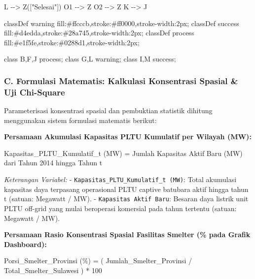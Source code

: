 \documentclass[
]{article}
\newenvironment{Shaded}{}{}
\newcommand{\NormalTok}[1]{#1}
\begin{document}
\begin{Shaded}
\begin{Highlighting}[]
\NormalTok{    L {-}{-}\textgreater{} Z(["Selesai"])}
\NormalTok{    O1 {-}{-}\textgreater{} Z}
\NormalTok{    O2 {-}{-}\textgreater{} Z}
\NormalTok{    K {-}{-}\textgreater{} J}
    
\NormalTok{    classDef warning fill:\#ffcccb,stroke:\#ff0000,stroke{-}width:2px;}
\NormalTok{    classDef success fill:\#d4edda,stroke:\#28a745,stroke{-}width:2px;}
\NormalTok{    classDef process fill:\#e1f5fe,stroke:\#0288d1,stroke{-}width:2px;}
    
\NormalTok{    class B,F,J process;}
\NormalTok{    class G,L warning;}
\NormalTok{    class I,M success;}
\end{Highlighting}
\end{Shaded}

\subsubsection{C. Formulasi Matematis: Kalkulasi Konsentrasi Spasial \&
Uji
Chi-Square}\label{c.-formulasi-matematis-kalkulasi-konsentrasi-spasial-uji-chi-square}

Parameterisasi konsentrasi spasial dan pembuktian statistik dihitung
menggunakan sistem formulasi matematis berikut:

\textbf{Persamaan Akumulasi Kapasitas PLTU Kumulatif per Wilayah (MW):}

\begin{Shaded}
\begin{Highlighting}[]
\NormalTok{Kapasitas\_PLTU\_Kumulatif\_t (MW) = Jumlah Kapasitas Aktif Baru (MW) dari Tahun 2014 hingga Tahun t}
\end{Highlighting}
\end{Shaded}

\emph{Keterangan Variabel:} -
\texttt{Kapasitas\_PLTU\_Kumulatif\_t\ (MW)}: Total akumulasi kapasitas
daya terpasang operasional PLTU captive batubara aktif hingga tahun t
(satuan: Megawatt / MW). - \texttt{Kapasitas\ Aktif\ Baru}: Besaran daya
listrik unit PLTU off-grid yang mulai beroperasi komersial pada tahun
tertentu (satuan: Megawatt / MW).

\textbf{Persamaan Rasio Konsentrasi Spasial Fasilitas Smelter (\% pada
Grafik Dashboard):}

\begin{Shaded}
\begin{Highlighting}[]
\NormalTok{Porsi\_Smelter\_Provinsi (\%) = ( Jumlah\_Smelter\_Provinsi / Total\_Smelter\_Sulawesi ) * 100}
\end{Highlighting}
\end{Shaded}
\end{document}
